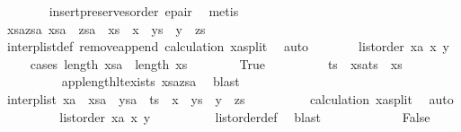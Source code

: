 \begin{isabellebody}
\ \ \ \ \ \ \isamarkupfalse%
\ insert{\isacharunderscore}preserves{\isacharunderscore}order\ e{\isacharunderscore}pair\ \isamarkupfalse%
\ metis\isanewline
\ \ \ \ \isamarkupfalse%
\ \isamarkupfalse%
\ xsa{\isacharunderscore}zsa{\isacharcolon}\ {\isachardoublequoteopen}xsa\ {\isacharat}\ zsa\ {\isacharequal}\ xs\ {\isacharat}\ x\ {\isacharhash}\ ys\ {\isacharat}\ y\ {\isacharhash}\ zs{\isachardoublequoteclose}\isanewline
\ \ \ \ \ \ \isamarkupfalse%
\ interp{\isacharunderscore}list{\isacharunderscore}def\ remove{}{\isacharunderscore}append\ calculation\ xa{\isacharunderscore}split\ \isamarkupfalse%
\ auto\isanewline
\ \ \ \ \isamarkupfalse%
\ \isamarkupfalse%
\ {\isachardoublequoteopen}list{\isacharunderscore}order\ xa\ x\ y{\isachardoublequoteclose}\isanewline
\ \ \ \ \isamarkupfalse%
{\isacharparenleft}cases\ {\isachardoublequoteopen}length\ xsa\ {\isasymle}\ length\ xs{\isachardoublequoteclose}{\isacharparenright}\isanewline
\ \ \ \ \ \ \isamarkupfalse%
\ True\isanewline
\ \ \ \ \ \ \isamarkupfalse%
\ \isamarkupfalse%
\ ts\ \ {\isachardoublequoteopen}xsa{\isacharat}ts\ {\isacharequal}\ xs{\isachardoublequoteclose}\isanewline
\ \ \ \ \ \ \ \ \isamarkupfalse%
\ app{\isacharunderscore}length{\isacharunderscore}lt{\isacharunderscore}exists\ xsa{\isacharunderscore}zsa\ \isamarkupfalse%
\ blast\isanewline
\ \ \ \ \ \ \isamarkupfalse%
\ {\isachardoublequoteopen}interp{\isacharunderscore}list\ xa\ {\isacharequal}\ {\isacharparenleft}xsa\ {\isacharat}\ ysa\ {\isacharat}\ ts{\isacharparenright}\ {\isacharat}\ {\isacharbrackleft}x{\isacharbrackright}\ {\isacharat}\ ys\ {\isacharat}\ {\isacharbrackleft}y{\isacharbrackright}\ {\isacharat}\ zs{\isachardoublequoteclose}\isanewline
\ \ \ \ \ \ \ \ \isamarkupfalse%
\ calculation\ xa{\isacharunderscore}split\ \isamarkupfalse%
\ auto\isanewline
\ \ \ \ \ \ \isamarkupfalse%
\ \isamarkupfalse%
\ {\isachardoublequoteopen}list{\isacharunderscore}order\ xa\ x\ y{\isachardoublequoteclose}\isanewline
\ \ \ \ \ \ \ \ \isamarkupfalse%
\ list{\isacharunderscore}order{\isacharunderscore}def\ \isamarkupfalse%
\ blast\isanewline
\ \ \ \ \isamarkupfalse%
\isanewline
\ \ \ \ \ \ \isamarkupfalse%
\ False\isanewline
\ \ \ \ \ \ \isamarkupfalse%

\end{isabellebody}
